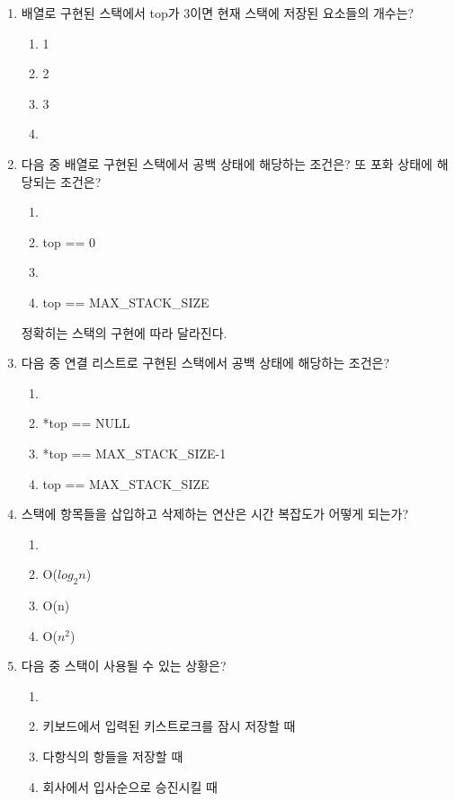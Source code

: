 \documentclass[11pt,a4paper]{article}
\begin{document}
\begin{enumerate}
\item 배열로 구현된 스택에서 top가 3이면 현재 스택에 저장된 요소들의 개수는?
	\begin{enumerate}
		\item 1
		\item 2
		\item 3
		\item {}
	\end{enumerate}

\item 다음 중 배열로 구현된 스택에서 공백 상태에 해당하는 조건은? 또 포화 상태에 해당되는 조건은?
	\begin{enumerate}
		\item {}
		\item top == 0
		\item {}
		\item top == MAX\_STACK\_SIZE
	\end{enumerate}
	정확히는 스택의 구현에 따라 달라진다.
	
\item 다음 중 연결 리스트로 구현된 스택에서 공백 상태에 해당하는 조건은?
	\begin{enumerate}
		\item {}
		\item *top == NULL
		\item *top == MAX\_STACK\_SIZE-1
		\item top == MAX\_STACK\_SIZE
	\end{enumerate}

\item 스택에 항목들을 삽입하고 삭제하는 연산은 시간 복잡도가 어떻게 되는가?
	\begin{enumerate}
		\item {}
		\item O($log_2n$)
		\item O(n)
		\item O($n^2$)
	\end{enumerate}
	
\item 다음 중 스택이 사용될 수 있는 상황은?
	\begin{enumerate}
		\item {}
		\item 키보드에서 입력된 키스트로크를 잠시 저장할 때
		\item 다항식의 항들을 저장할 때
		\item 회사에서 입사순으로 승진시킬 때
	\end{enumerate}
\lstset{language=C, tabsize=4, frame=single, showstringspaces=false, breaklines=true, columns=flexible, basicstyle=\ttfamily\small}



\end{enumerate}
\end{document}
